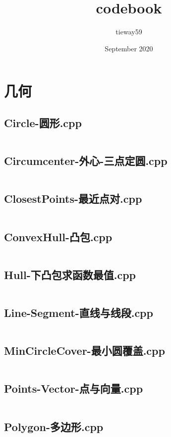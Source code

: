 \documentclass[a4paper,landscape,twocolumn]{book} %
\title{codebook}
\author{tieway59}
\date{September 2020}
\begin{document}

\begingroup
\let\onecolumn\twocolumn
\tableofcontents
\endgroup


\chapter{几何}
\section{Circle-圆形.cpp}
\inputminted{c++}{./codes/000}
\section{Circumcenter-外心-三点定圆.cpp}
\inputminted{c++}{./codes/001}
\section{ClosestPoints-最近点对.cpp}
\inputminted{c++}{./codes/002}
\section{ConvexHull-凸包.cpp}
\inputminted{c++}{./codes/003}
\section{Hull-下凸包求函数最值.cpp}
\inputminted{c++}{./codes/004}
\section{Line-Segment-直线与线段.cpp}
\inputminted{c++}{./codes/005}
\section{MinCircleCover-最小圆覆盖.cpp}
\inputminted{c++}{./codes/006}
\section{Points-Vector-点与向量.cpp}
\inputminted{c++}{./codes/007}
\section{Polygon-多边形.cpp}
\inputminted{c++}{./codes/008}
\end{document}
